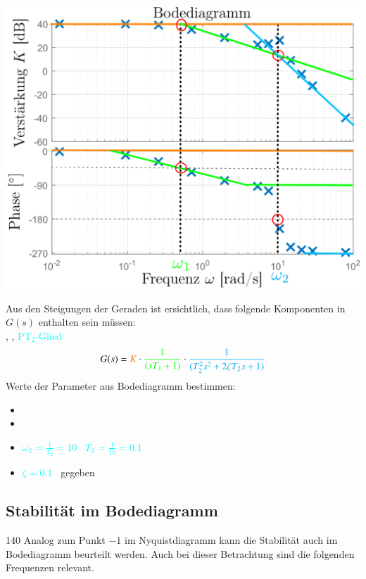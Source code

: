 \begin{minipage}[c]{0.5\columnwidth}
    \includegraphics[width=\columnwidth]{images/bode_zu_modell.png}
\end{minipage}
\hfill
\begin{minipage}[c]{0.48\columnwidth}
    Aus den Steigungen der Geraden ist ersichtlich, dass folgende Komponenten in $G(s)$ enthalten sein müssen: \\
    , , \textcolor{cyan}{$\text{PT}_2$-Glied}
    $$ G(s) = {\color{orange}K} \cdot {\color{green}\frac{1}{(s T_1 + 1)}} \cdot \textcolor{cyan}{\frac{1}{(T_2^2 s^2 + 2 \zeta T_2 s + 1)}} $$
    Werte der Parameter aus Bodediagramm bestimmen:
    \begin{itemize}
        \item {}
        \item {}
        \item \textcolor{cyan}{$\omega_2 = \frac{1}{T_2} = 10$ \textrightarrow\ $T_2 = \frac{1}{10} = 0.1$}
        \item \textcolor{cyan}{$\zeta = 0.1$} \textrightarrow\ gegeben 
    \end{itemize}
\end{minipage}



\subsection{Stabilität im Bodediagramm}{140}
Analog zum Punkt $-1$ im Nyquistdiagramm kann die Stabilität auch im Bodediagramm beurteilt werden. Auch bei dieser Betrachtung 
sind die folgenden Frequenzen relevant.

